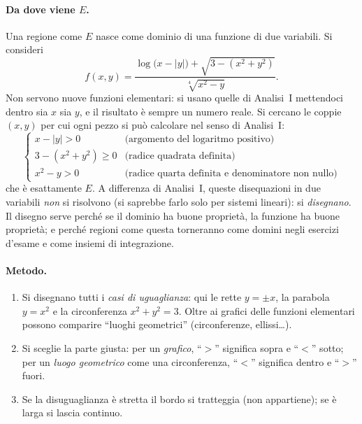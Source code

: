 \paragraph{Da dove viene $E$.} Una regione come $E$ nasce come dominio di una funzione di due variabili. Si consideri
\[
  f(x,y)=\frac{\log\bigl(x-|y|\bigr)+\sqrt{3-(x^2+y^2)}}{\sqrt[4]{x^2-y}} .
\]
Non servono nuove funzioni elementari: si usano quelle di Analisi~I mettendoci dentro sia $x$ sia $y$, e il risultato è sempre un numero reale. Si cercano le coppie $(x,y)$ per cui ogni pezzo si può calcolare nel senso di Analisi~I:
\[
  \begin{cases}
    x-|y|>0 & \text{(argomento del logaritmo positivo)}\\[2pt]
    3-(x^2+y^2)\geq 0 & \text{(radice quadrata definita)}\\[2pt]
    x^2-y>0 & \text{(radice quarta definita e denominatore non nullo)}
  \end{cases}
\]
che è esattamente $E$.
A differenza di Analisi~I, queste disequazioni in due variabili \emph{non} si risolvono (si saprebbe farlo solo per sistemi lineari): si \emph{disegnano}. Il disegno serve perché se il dominio ha buone proprietà, la funzione ha buone proprietà; e perché regioni come questa torneranno come domini negli esercizi d'esame e come insiemi di integrazione.

\paragraph{Metodo.}
\begin{enumerate}
  \item Si disegnano tutti i \emph{casi di uguaglianza}: qui le rette $y=\pm x$, la parabola $y=x^2$ e la circonferenza $x^2+y^2=3$. Oltre ai grafici delle funzioni elementari possono comparire ``luoghi geometrici'' (circonferenze, ellissi\ldots).
  \item Si sceglie la parte giusta: per un \emph{grafico}, ``$>$'' significa sopra e ``$<$'' sotto; per un \emph{luogo geometrico} come una circonferenza, ``$<$'' significa dentro e ``$>$'' fuori.
  \item Se la disuguaglianza è stretta il bordo si tratteggia (non appartiene); se è larga si lascia continuo.
\end{enumerate}

